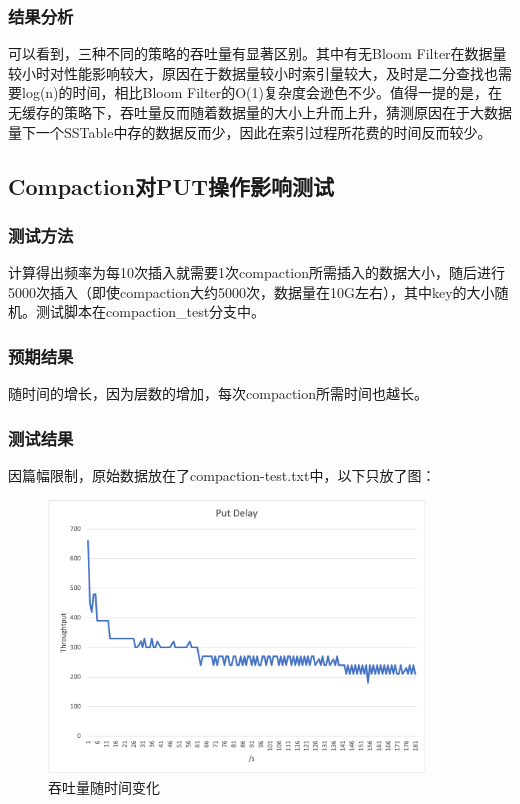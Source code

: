 \documentclass{ctexart}
\begin{document}
\subsubsection{结果分析}
可以看到，三种不同的策略的吞吐量有显著区别。其中有无Bloom Filter在数据量较小时对性能影响较大，原因在于数据量较小时索引量较大，及时是二分查找也需要log(n)的时间，相比Bloom Filter的O(1)复杂度会逊色不少。值得一提的是，在无缓存的策略下，吞吐量反而随着数据量的大小上升而上升，猜测原因在于大数据量下一个SSTable中存的数据反而少，因此在索引过程所花费的时间反而较少。


\subsection{Compaction对PUT操作影响测试}

\subsubsection{测试方法}
计算得出频率为每10次插入就需要1次compaction所需插入的数据大小，随后进行5000次插入（即使compaction大约5000次，数据量在10G左右），其中key的大小随机。测试脚本在compaction\_test分支中。

\subsubsection{预期结果}
随时间的增长，因为层数的增加，每次compaction所需时间也越长。

\subsubsection{测试结果}
因篇幅限制，原始数据放在了compaction-test.txt中，以下只放了图：
\begin{figure}[h!]
  \centering
  \includegraphics[width=10cm]{Compaction.png}
  \caption{吞吐量随时间变化}
\end{figure}
\end{document}
